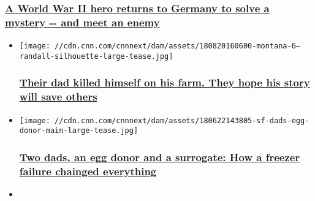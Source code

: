 \begin{itemize}
  \hypertarget{a-world-war-ii-hero-returns-to-germany-to-solve-a-mystery----and-meet-an-enemy}{%
  \subsubsection{\texorpdfstring{\href{/2018/11/10/us/ww2-reunion-us-german-veterans/index.html}{A
  World War II hero returns to Germany to solve a mystery -\/- and meet
  an
  enemy}}{A World War II hero returns to Germany to solve a mystery -\/- and meet an enemy}}\label{a-world-war-ii-hero-returns-to-germany-to-solve-a-mystery----and-meet-an-enemy}}
\end{itemize}

\begin{itemize}
\item
  \href{/2018/08/21/health/rural-suicides-among-farmers/index.html}{}

  \texttt{[image: //cdn.cnn.com/cnnnext/dam/assets/180820160600-montana-6---randall-silhouette-large-tease.jpg]}

  \hypertarget{their-dad-killed-himself-on-his-farm-they-hope-his-story-will-save-others}{%
  \subsubsection{\texorpdfstring{\href{/2018/08/21/health/rural-suicides-among-farmers/index.html}{Their
  dad killed himself on his farm. They hope his story will save
  others}}{Their dad killed himself on his farm. They hope his story will save others}}\label{their-dad-killed-himself-on-his-farm-they-hope-his-story-will-save-others}}
\item
  \href{/2018/06/28/health/embryos-egg-donor-surrogate/index.html}{}

  \texttt{[image: //cdn.cnn.com/cnnnext/dam/assets/180622143805-sf-dads-egg-donor-main-large-tease.jpg]}

  \hypertarget{two-dads-an-egg-donor-and-a-surrogate-how-a-freezer-failure-chainged-everything}{%
  \subsubsection{\texorpdfstring{\href{/2018/06/28/health/embryos-egg-donor-surrogate/index.html}{Two
  dads, an egg donor and a surrogate: How a freezer failure chainged
  everything}}{Two dads, an egg donor and a surrogate: How a freezer failure chainged everything}}\label{two-dads-an-egg-donor-and-a-surrogate-how-a-freezer-failure-chainged-everything}}
\item
  \href{/2018/08/23/health/cara-pressman-surgery-update-aetna/index.html}{}


\end{itemize}
